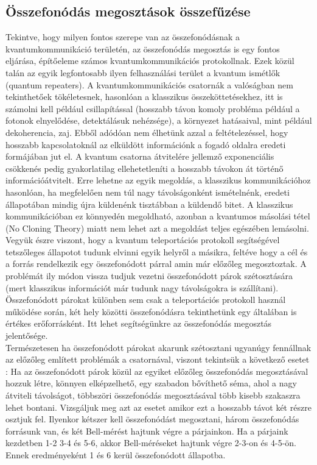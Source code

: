 \subsection{Összefonódás megosztások összefűzése}

Tekintve, hogy milyen fontos szerepe van az összefonódásnak a kvantumkommunikáció területén, az összefonódás megosztás is egy fontos eljárása, építőeleme számos kvantumkommunikációs protokollnak. Ezek közül talán az egyik legfontosabb ilyen felhasználási terület
a kvantum ismétlők (quantum repeaters). A kvantumkommunikációs csatornák a valóságban nem tekinthetőek tökéletesnek, hasonlóan a klasszikus összeköttetésekhez, itt is számolni kell például csillapítással (hosszabb távon komoly probléma például a fotonok elnyelődése, detektálásuk nehézsége), a környezet hatásaival, mint például dekoherencia, zaj. Ebből adódóan nem élhetünk azzal a feltételezéssel, hogy hosszabb kapcsolatoknál az elküldött információnk a fogadó oldalra eredeti formájában jut el. A kvantum csatorna átvitelére jellemző exponenciális csökkenés pedig gyakorlatilag ellehetetleníti a hosszabb távokon át történő információátvitelt. Erre lehetne az egyik megoldás, a klasszikus kommunikációhoz hasonlóan, ha megfelelően nem túl nagy távolságonként ismételnénk, eredeti állapotában mindig újra küldenénk tisztábban a küldendő bitet. A klasszikus kommunikációban ez könnyedén megoldható, azonban a kvantumos másolási tétel (No Cloning Theory) miatt nem lehet azt a megoldást teljes egészében lemásolni. Vegyük észre viszont, hogy a kvantum teleportációs protokoll segítségével tetszőleges állapotot tudunk elvinni egyik helyről a másikra, feltéve hogy a cél és a forrás rendelkezik egy összefonódott párral amin már előzőleg megosztoztak. A problémát ily módon vissza tudjuk vezetni összefonódott párok szétosztására (mert klasszikus információt már tudunk nagy távolságokra is szállítani). Összefonódott párokat különben sem csak a teleportációs protokoll használ működése során, két hely közötti összefonódásra tekinthetünk egy általában is értékes erőforrásként. Itt lehet segítségünkre az összefonódás megosztás jelentősége.  \\
 
Természetesen ha összefonódott párokat akarunk szétosztani ugyanúgy fennállnak az előzőleg említett problémák a csatornával, viszont tekintsük a következő esetet \cite{goebel2008multistage}: Ha az összefonódott párok közül az egyiket előzőleg összefonódás megosztásával hozzuk létre, könnyen elképzelhető, egy szabadon bővíthető séma, ahol a nagy átviteli távolságot, többszöri összefonódás megosztásával több kisebb szakaszra lehet bontani.
Vizsgáljuk meg azt az esetet amikor ezt a hosszabb távot két részre osztjuk fel. Ilyenkor kétszer kell összefonódást megosztani, három összefonódás forrásunk van, és két Bell-mérést hajtunk végre a párjainkon. Ha a párjaink kezdetben 1-2 3-4 és 5-6, akkor Bell-méréseket hajtunk végre 2-3-on és 4-5-ön. Ennek eredményeként 1 és 6 kerül összefonódott állapotba.
\\

